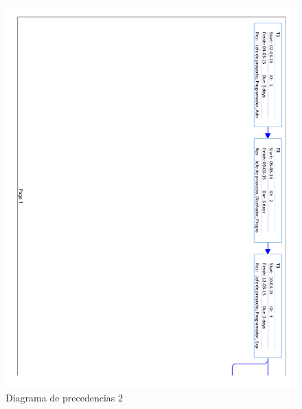 \begin{figure}[!htbp]
	\centering
	\includegraphics[page=2, scale=.65]{fig/network_diagram}
	\caption{Diagrama de precedencias 2}
\end{figure}

